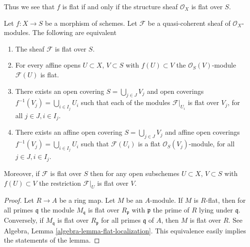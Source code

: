 \noindent
Thus we see that $f$ is flat if and only if
the structure sheaf $\mathcal{O}_X$ is flat over $S$.

\begin{lemma}
\label{lemma-flat-module-characterize}
Let $f : X \to S$ be a morphism of schemes.
Let $\mathcal{F}$ be a quasi-coherent sheaf of $\mathcal{O}_X$-modules.
The following are equivalent
\begin{enumerate}
\item The sheaf $\mathcal{F}$ is flat over $S$.
\item For every affine opens $U \subset X$, $V \subset S$
with $f(U) \subset V$ the $\mathcal{O}_S(V)$-module $\mathcal{F}(U)$ is flat.
\item There exists an open covering $S = \bigcup_{j \in J} V_j$
and open coverings $f^{-1}(V_j) = \bigcup_{i \in I_j} U_i$ such
that each of the modules $\mathcal{F}|_{U_i}$ is
flat over $V_j$, for all $j\in J, i\in I_j$.
\item There exists an affine open covering $S = \bigcup_{j \in J} V_j$
and affine open coverings $f^{-1}(V_j) = \bigcup_{i \in I_j} U_i$ such
that $\mathcal{F}(U_i)$ is a flat $\mathcal{O}_S(V_j)$-module, for all
$j\in J, i\in I_j$.
\end{enumerate}
Moreover, if $\mathcal{F}$ is flat over $S$ then for
any open subschemes $U \subset X$, $V \subset S$ with $f(U) \subset V$
the restriction $\mathcal{F}|_U$ is flat over $V$.
\end{lemma}

\begin{proof}
Let $R \to A$ be a ring map. Let $M$ be an $A$-module.
If $M$ is $R$-flat, then for all primes
$\mathfrak q$ the module $M_{\mathfrak q}$ is flat over $R_{\mathfrak p}$
with $\mathfrak p$ the prime of $R$ lying under $\mathfrak q$. Conversely, if
$M_{\mathfrak q}$ is flat over $R_{\mathfrak p}$ for all primes $\mathfrak q$
of $A$, then $M$ is flat over $R$. See
Algebra, Lemma \ref{algebra-lemma-flat-localization}.
This equivalence easily implies the statements of the lemma.
\end{proof}

